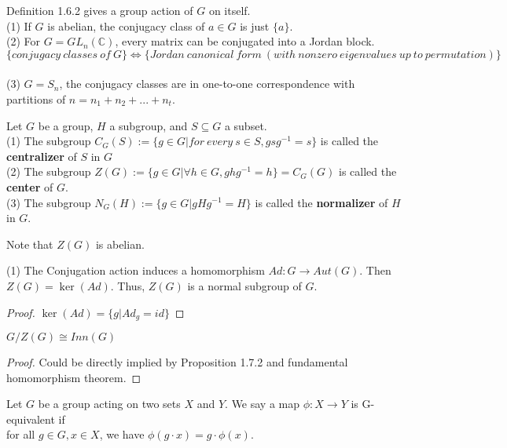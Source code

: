 \documentclass[11pt,fleqn]{book} %
\begin{document}
\begin{CJK}{UTF8}{gkai}
\begin{example}
	 Definition 1.6.2 gives a group action of $G$ on itself. \\
	(1) If $G$ is abelian, the conjugacy class of $a\in G$ is just $\{a\}$. \\
	(2) For $G = GL_n(\mathbb{C})$, every matrix can be conjugated into a Jordan block. \[
		\{conjugacy \ classes \ of \ G\} \iff \{Jordan \ canonical\ form \ (with \ nonzero \ eigenvalues \ up \ to \ permutation)\} \] \\
	(3) $G = S_n$, the conjugacy classes are in one-to-one correspondence with partitions of $n = n_1 + n_2 + ... + n_t$.
\end{example}

\begin{definition}
	 Let $G$ be a group, $H$ a subgroup, and $S \subseteq G$ a subset.  \\
	(1) The subgroup $C_G(S) :=\{g\in G | for \ every \ s \in S, gsg^{-1} = s\}$ is called the {\bf centralizer} of $S$ in $G$\\
	(2) The subgroup $Z(G) :=\{g\in G | \forall h \in G, ghg^{-1} = h\} = C_G(G)$ is called the {\bf center} of $G$. \\
	(3) The subgroup $N_G(H) := \{g \in G | gHg^{-1} = H\}$ is called the {\bf normalizer} of $H$ in $G$.
\end{definition}

\begin{remark}
	Note that $Z(G)$ is abelian.
\end{remark}
\begin{proposition}
	(1) The Conjugation action induces a homomorphism $Ad: G \to Aut(G)$. Then $Z(G) = \ker (Ad)$. Thus, $Z(G)$ is a normal subgroup of $G$.
\end{proposition}
\begin{proof}
	$\ker (Ad) = \{g | Ad_g = id\}$	
\end{proof}

\begin{proposition}
	$G/Z(G) \cong Inn(G)$	
\end{proposition}
\begin{proof}
	Could be directly implied by Proposition 1.7.2 and fundamental homomorphism theorem.
\end{proof}

\begin{definition}
	[G-equivariant] Let $G$ be a group acting on two sets $X$ and $Y$. We say a map $\phi: X \to Y$ is G-equivalent if \\
	for all $g\in G, x \in X$, we have $\phi(g\cdot x) = g\cdot \phi(x)$.
\end{definition}


\end{CJK}
\end{document}
